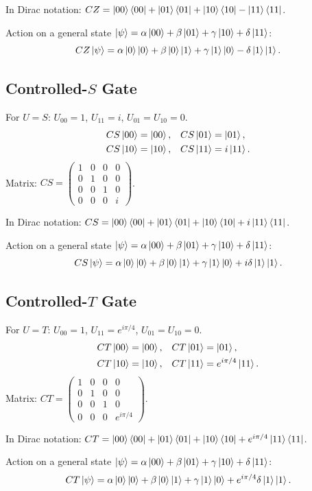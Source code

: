 \documentclass[10pt,a4paper]{article}
\begin{document}
In Dirac notation: $CZ = \ket{00}\bra{00}+\ket{01}\bra{01}+\ket{10}\bra{10}-\ket{11}\bra{11}$.

Action on a general state $\ket{\psi}=\alpha\ket{00}+\beta\ket{01}+\gamma\ket{10}+\delta\ket{11}$:
\[
CZ\ket{\psi} = \alpha\ket{0}\ket{0}+\beta\ket{0}\ket{1}+\gamma\ket{1}\ket{0}-\delta\ket{1}\ket{1}.
\]

\subsection{Controlled-$S$ Gate}
For $U=S$: $U_{00}=1$, $U_{11}=i$, $U_{01}=U_{10}=0$.
\begin{align*}
CS\ket{00}&=\ket{00}, & CS\ket{01}&=\ket{01}, \\
CS\ket{10}&=\ket{10}, & CS\ket{11}&=i\ket{11}.
\end{align*}
Matrix: $CS =\begin{pmatrix}1&0&0&0\\0&1&0&0\\0&0&1&0\\0&0&0&i\end{pmatrix}$.

In Dirac notation: $CS = \ket{00}\bra{00}+\ket{01}\bra{01}+\ket{10}\bra{10}+i\ket{11}\bra{11}$.

Action on a general state $\ket{\psi}=\alpha\ket{00}+\beta\ket{01}+\gamma\ket{10}+\delta\ket{11}$:
\[
CS\ket{\psi} = \alpha\ket{0}\ket{0}+\beta\ket{0}\ket{1}+\gamma\ket{1}\ket{0}+i\delta\ket{1}\ket{1}.
\]

\subsection{Controlled-$T$ Gate}
For $U=T$: $U_{00}=1$, $U_{11}=e^{i\pi/4}$, $U_{01}=U_{10}=0$.
\begin{align*}
CT\ket{00}&=\ket{00}, & CT\ket{01}&=\ket{01}, \\
CT\ket{10}&=\ket{10}, & CT\ket{11}&=e^{i\pi/4}\ket{11}.
\end{align*}
Matrix: $CT =\begin{pmatrix}1&0&0&0\\0&1&0&0\\0&0&1&0\\0&0&0&e^{i\pi/4}\end{pmatrix}$.

In Dirac notation: $CT = \ket{00}\bra{00}+\ket{01}\bra{01}+\ket{10}\bra{10}+e^{i\pi/4}\ket{11}\bra{11}$.

Action on a general state $\ket{\psi}=\alpha\ket{00}+\beta\ket{01}+\gamma\ket{10}+\delta\ket{11}$:
\[
CT\ket{\psi} = \alpha\ket{0}\ket{0}+\beta\ket{0}\ket{1}+\gamma\ket{1}\ket{0}+e^{i\pi/4}\delta\ket{1}\ket{1}.
\]
\end{document}
